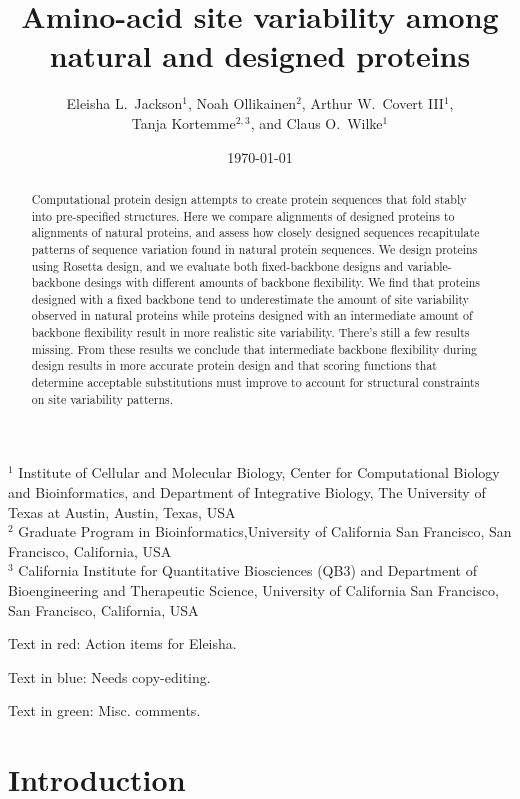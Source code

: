 \documentclass[12pt]{article}
\title{Amino-acid site variability among natural and designed proteins}
\author{Eleisha L.\ Jackson$^1$, Noah Ollikainen$^2$, Arthur W.\ Covert III$^1$,\\ Tanja Kortemme$^{2,3}$, and Claus O.\ Wilke$^1$}
\begin{document}
\date{\today}
\maketitle

\noindent
$^1$ Institute of Cellular and Molecular Biology, Center for Computational Biology and Bioinformatics, and Department of Integrative Biology, The University of Texas at Austin, Austin, Texas, USA\\
$^2$ Graduate Program in Bioinformatics,University of California San Francisco, San Francisco, California, USA\\
$^3$ California Institute for Quantitative Biosciences (QB3) and Department of Bioengineering and Therapeutic Science, University of California San Francisco, San Francisco, California, USA

\bigskip

\noindent
{\color{red}Text in red: Action items for Eleisha.}

\noindent
{\color{blue}Text in blue: Needs copy-editing.}

\noindent
{\color{green}Text in green: Misc. comments.}


\begin{abstract}
Computational protein design attempts to create protein sequences that fold stably into pre-specified structures. Here we compare alignments of designed proteins to alignments of natural proteins, and assess how closely designed sequences recapitulate patterns of sequence variation found in natural protein sequences. We design proteins using Rosetta design, and we evaluate both fixed-backbone designs and variable-backbone desings with different amounts of backbone flexibility. We find that proteins designed with a fixed backbone tend to underestimate the amount of site variability observed in natural proteins while proteins designed with an intermediate amount of backbone flexibility result in more realistic site variability. {\color{red}There's still a few results missing.} From these results we conclude that intermediate backbone flexibility during design results in more accurate protein design and that scoring functions that determine acceptable substitutions must improve to account for structural constraints on site variability patterns.
\end{abstract}

\section{Introduction}
\label{Introduction}
\end{document}
